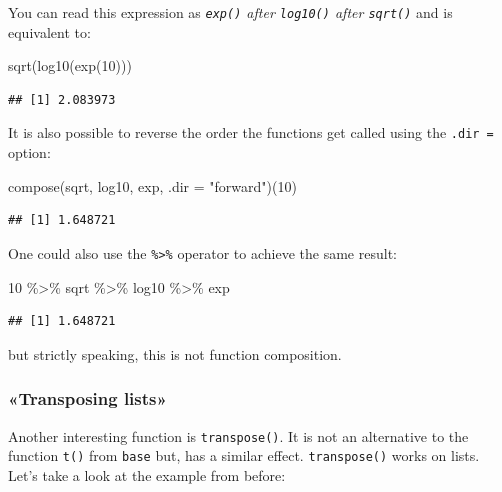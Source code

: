 \documentclass[
]{article}
\newenvironment{Shaded}{\begin{snugshade}}{\end{snugshade}}
\newcommand{\AttributeTok}[1]{\textcolor[rgb]{0.77,0.63,0.00}{#1}}
\newcommand{\DecValTok}[1]{\textcolor[rgb]{0.00,0.00,0.81}{#1}}
\newcommand{\FunctionTok}[1]{\textcolor[rgb]{0.00,0.00,0.00}{#1}}
\newcommand{\NormalTok}[1]{#1}
\newcommand{\SpecialCharTok}[1]{\textcolor[rgb]{0.00,0.00,0.00}{#1}}
\newcommand{\StringTok}[1]{\textcolor[rgb]{0.31,0.60,0.02}{#1}}
\begin{document}
You can read this expression as \emph{\texttt{exp()} after \texttt{log10()} after \texttt{sqrt()}} and is equivalent to:

\begin{Shaded}
\begin{Highlighting}[]
\FunctionTok{sqrt}\NormalTok{(}\FunctionTok{log10}\NormalTok{(}\FunctionTok{exp}\NormalTok{(}\DecValTok{10}\NormalTok{)))}
\end{Highlighting}
\end{Shaded}

\begin{verbatim}
## [1] 2.083973
\end{verbatim}

It is also possible to reverse the order the functions get called using the \texttt{.dir\ =} option:

\begin{Shaded}
\begin{Highlighting}[]
\FunctionTok{compose}\NormalTok{(sqrt, log10, exp, }\AttributeTok{.dir =} \StringTok{"forward"}\NormalTok{)(}\DecValTok{10}\NormalTok{)}
\end{Highlighting}
\end{Shaded}

\begin{verbatim}
## [1] 1.648721
\end{verbatim}

One could also use the \texttt{\%\textgreater{}\%} operator to achieve the same result:

\begin{Shaded}
\begin{Highlighting}[]
\DecValTok{10} \SpecialCharTok{\%\textgreater{}\%}
\NormalTok{  sqrt }\SpecialCharTok{\%\textgreater{}\%}
\NormalTok{  log10 }\SpecialCharTok{\%\textgreater{}\%}
\NormalTok{  exp}
\end{Highlighting}
\end{Shaded}

\begin{verbatim}
## [1] 1.648721
\end{verbatim}

but strictly speaking, this is not function composition.

\hypertarget{transposing-lists}{%
\subsubsection{«Transposing lists»}\label{transposing-lists}}

Another interesting function is \texttt{transpose()}. It is not an alternative to the function \texttt{t()} from
\texttt{base} but, has a similar effect. \texttt{transpose()} works on lists. Let's take a look at the example
from before:
\end{document}
